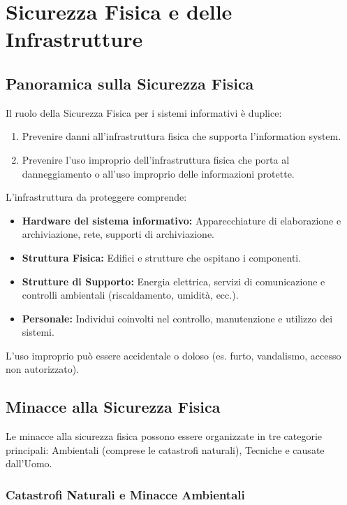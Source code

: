 \chapter{Sicurezza Fisica e delle Infrastrutture}

\section{Panoramica sulla Sicurezza Fisica}

Il ruolo della Sicurezza Fisica per i sistemi informativi è duplice:
\begin{enumerate}
    \item Prevenire danni all'infrastruttura fisica che supporta l'information system.
    \item Prevenire l'uso improprio dell'infrastruttura fisica che porta al danneggiamento o all'uso improprio delle informazioni protette.
\end{enumerate}

L'infrastruttura da proteggere comprende:
\begin{itemize}
    \item \textbf{Hardware del sistema informativo:} Apparecchiature di elaborazione e archiviazione, rete, supporti di archiviazione.
    \item \textbf{Struttura Fisica:} Edifici e strutture che ospitano i componenti.
    \item \textbf{Strutture di Supporto:} Energia elettrica, servizi di comunicazione e controlli ambientali (riscaldamento, umidità, ecc.).
    \item \textbf{Personale:} Individui coinvolti nel controllo, manutenzione e utilizzo dei sistemi.
\end{itemize}

L'uso improprio può essere accidentale o doloso (es. furto, vandalismo, accesso non autorizzato).

\section{Minacce alla Sicurezza Fisica}

Le minacce alla sicurezza fisica possono essere organizzate in tre categorie principali: Ambientali (comprese le catastrofi naturali), Tecniche e causate dall'Uomo.

\subsection{Catastrofi Naturali e Minacce Ambientali}

